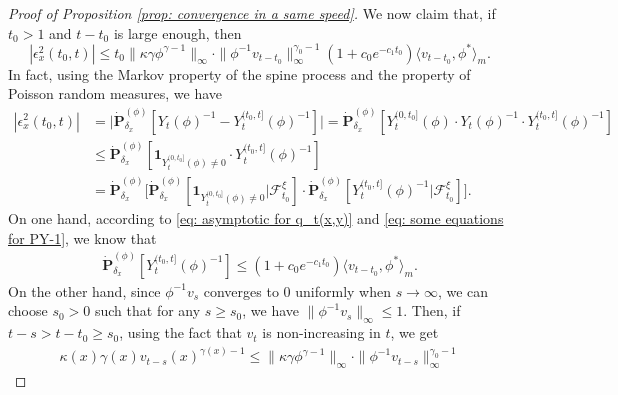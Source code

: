 \documentclass[12pt, a4paper]{amsart}
\theoremstyle{definition}
\numberwithin{equation}{section}
\begin{document}
\begin{proof}[Proof of Proposition \ref{prop: convergence in a same speed}]
	We now claim that, if $t_0 > 1$ and $t-t_0$ is large enough, then
\begin{equation}\label{eq:upperbound_of_epsilon-2}
	|\epsilon_x^2(t_0,t)|
	\leq t_0\|\kappa\gamma\phi^{\gamma - 1}\|_{\infty} \cdot \|\phi^{-1}v_{t-t_0}\|^{\gamma_0-1}_\infty (1+c_0 e^{-c_1 t_0}) \langle v_{t-t_0},\phi^* \rangle_m.
\end{equation}
	In fact, using the Markov property of the spine process and the property of Poisson random measures, we have
\begin{equation}\label{eq:epsilon-2}\begin{split}
	|\epsilon_x^2(t_0,t)|
	&= \big| \dot{\mathbf P}_{\delta_x}^{(\phi)}[Y_t(\phi)^{-1} - Y^{(t_0,t]}_t(\phi)^{-1}] \big|
	= \dot{\mathbf P}_{\delta_x}^{(\phi)}[Y_t^{(0,t_0]}(\phi)\cdot Y_t(\phi)^{-1}\cdot Y^{(t_0,t]}_t(\phi)^{-1}]
	\\&\leq \dot{\mathbf P}_{\delta_x}^{(\phi)}[\mathbf 1_{Y_t^{(0,t_0]}(\phi)\neq 0}\cdot Y^{(t_0,t]}_t(\phi)^{-1}]
	\\&= \dot{\mathbf P}_{\delta_x}^{(\phi)} \big[\dot{\mathbf P}_{\delta_x}^{(\phi)}[\mathbf 1_{Y_t^{(0,t_0]}(\phi)\neq 0}|\mathscr F^\xi_{t_0}] \cdot \dot{\mathbf P}_{\delta_x}^{(\phi)} [ Y^{(t_0,t]}_t(\phi)^{-1}|\mathscr F^\xi_{t_0}] \big].
\end{split}\end{equation}
	On one hand, according to \eqref{eq: asymptotic for q_t(x,y)} and \eqref{eq: some equations for PY-1}, we know that
\begin{equation}\label{eq:epsilon-2-final}\begin{split}
	\dot{\mathbf P}_{\delta_x}^{(\phi)}[ Y^{(t_0,t]}_t(\phi)^{-1}]
	\leq (1+c_0 e^{-c_1 t_0}) \langle v_{t-t_0},\phi^* \rangle_m.
\end{split}\end{equation}
	On the other hand, since $\phi^{-1}v_s$ converges to $0$ uniformly when $s\to \infty$, we can choose  $s_0>0$ such that for any $s\geq s_0$, we have $\|\phi^{-1}v_s\|_{\infty} \leq 1$.
	Then, if $t-s > t-t_0 \geq s_0$, 
	using the fact that $v_t$ is non-increasing in $t$, we get
\begin{equation}\begin{split}
	\kappa(x)\gamma(x) v_{t-s}(x)^{\gamma(x)-1}
	\leq \|\kappa \gamma \phi^{\gamma - 1}\|_\infty \cdot \|\phi^{-1} v_{t-s}\|^{\gamma_0-1}_\infty

\end{split}
\end{equation}
\end{proof}
\end{document}
